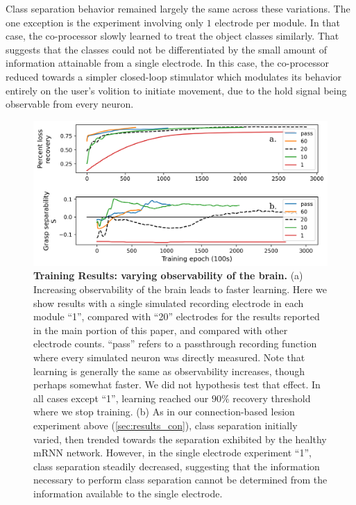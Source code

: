\documentclass[12pt]{iopart}
\begin{document}
Class separation behavior remained largely the same across these variations. The one exception is the experiment
involving only $1$ electrode per module. In that case, the co-processor
slowly learned to treat the object classes similarly. That suggests that
the classes could not be differentiated by the small amount of information
attainable from a single electrode. In this case, the co-processor reduced
towards a simpler closed-loop stimulator which modulates its behavior
entirely on the user's volition to initiate movement, due to the hold
signal being observable from every neuron.

\begin{figure}[h!]
\centering
\includegraphics[scale=0.7]{training_results_observability.png}
\caption{\textbf{Training Results: varying observability of the brain.}
         (a) Increasing observability of the brain leads to faster learning. Here
         we show results with a single simulated recording electrode in each module
         ``1'', compared with ``20'' electrodes for the results reported in the main
         portion of this paper, and compared with other electrode counts. ``pass''
         refers to a passthrough recording function where every simulated neuron was
         directly measured. Note that learning is generally the same as observability
         increases, though perhaps somewhat faster. We did not hypothesis test that effect.
         In all cases except ``1'', learning reached our $90\%$ recovery threshold where
         we stop training. (b) As in our connection-based lesion experiment above
         (\ref{sec:results_con}), class separation initially varied, then trended towards the
         separation exhibited by the healthy mRNN network. However, in
         the single electrode experiment ``1'', class separation steadily decreased, suggesting
         that the information necessary to perform class separation cannot be determined from
         the information available to the single electrode.}
\label{fig:results_observability}
\end{figure}
\end{document}
